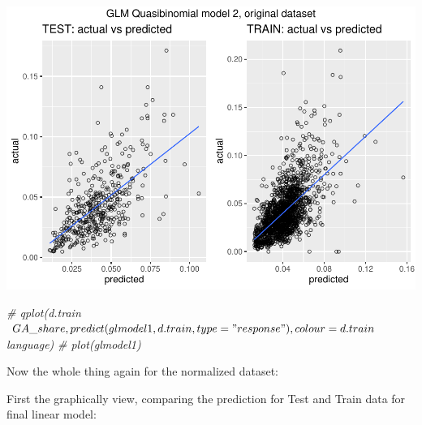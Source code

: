 \documentclass[
]{article}
\newenvironment{Shaded}{\begin{snugshade}}{\end{snugshade}}
\newcommand{\CommentTok}[1]{\textcolor[rgb]{0.56,0.35,0.01}{\textit{#1}}}
\begin{document}
\includegraphics{Lin_Mod_Clus_Analysis_files/figure-latex/unnamed-chunk-33-1.pdf}

\begin{Shaded}
\begin{Highlighting}[]
\CommentTok{\# qplot(d.train$GA\_share, predict(glmodel1, d.train, type="response"), colour = d.train$language)}
\CommentTok{\# plot(glmodel1)}
\end{Highlighting}
\end{Shaded}

Now the whole thing again for the normalized dataset:

First the graphically view, comparing the prediction for Test and Train
data for final linear model:
\end{document}
